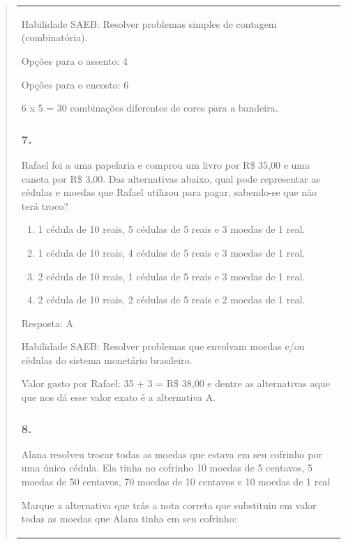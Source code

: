 \begin{enumerate}
\begin{escolha}
\begin{enumerate}
\begin{itemize}
\begin{itemize}
\begin{escolha}
\begin{quote}
\begin{escolha}
{\begin{longtable}[]{@{}l@{}}
\begin{itemize}
Habilidade SAEB: Resolver problemas simples de contagem (combinatória).

Opções para o assento: 4

Opções para o encosto: 6

6 x 5 = 30 combinações diferentes de cores para a bandeira.

\subsubsection{7.}\label{section-193}

Rafael foi a uma papelaria e comprou um livro por R\$ 35,00 e uma caneta
por R\$ 3,00. Das alternativas abaixo, qual pode representar as cédulas
e moedas que Rafael utilizou para pagar, sabendo-se que não terá troco?

\begin{enumerate}
\def\labelenumi{\alph{enumi})}
\item
  1 cédula de 10 reais, 5 cédulas de 5 reais e 3 moedas de 1 real.
\item
  1 cédula de 10 reais, 4 cédulas de 5 reais e 3 moedas de 1 real.
\item
  2 cédula de 10 reais, 1 cédulas de 5 reais e 3 moedas de 1 real.
\item
  2 cédula de 10 reais, 2 cédulas de 5 reais e 2 moedas de 1 real.
\end{enumerate}

Resposta: A

Habilidade SAEB: Resolver problemas que envolvam moedas e/ou cédulas do
sistema monetário brasileiro.

Valor gasto por Rafael: 35 + 3 = R\$ 38,00 e dentre as alternativas aque
que nos dá esse valor exato é a alternativa A.

\subsubsection{8.}\label{section-194}

Alana resolveu trocar todas as moedas que estava em seu cofrinho por uma
única cédula. Ela tinha no cofrinho 10 moedas de 5 centavos, 5 moedas de
50 centavos, 70 moedas de 10 centavos e 10 moedas de 1 real

Marque a alternativa que trás a nota correta que substituiu em valor
todas as moedas que Alana tinha em seu cofrinho:


\end{itemize}
\end{longtable}}
\end{escolha}
\end{quote}
\end{escolha}
\end{itemize}
\end{itemize}
\end{enumerate}
\end{escolha}
\end{enumerate}
